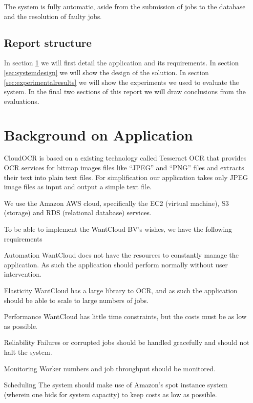 \documentclass[a4paper]{IEEEtran}
\begin{document}
The system is fully automatic, aside from the submission of jobs to the database and the resolution of faulty jobs.

\subsection*{Report structure}
In section \ref{sec:backgroundonapplication} we will first detail the application and its requirements. In section \ref{sec:systemdesign} we will show the design of the solution. In section \ref{sec:experimentalresults} we will show the experiments we used to evaluate the system.
In the final two sections of this report we will draw conclusions from the evaluations.

\section{Background on Application}
\label{sec:backgroundonapplication}
CloudOCR is based on a existing technology called Tesseract OCR \cite{tesseractocr} that provides OCR services for bitmap images files like ``JPEG'' and ``PNG'' files and extracts their text into plain text files. For simplification our application takes only JPEG image files as input and output a simple text file.

We use the Amazon AWS cloud, specifically the EC2 (virtual machine), S3 (storage) and RDS (relational database) services.

To be able to implement the WantCloud BV's wishes, we have the following requirements
\begin{LaTeXdescription}
	\item[Automation] WantCloud does not have the resources to constantly manage the application. As such the application should perform normally without user intervention.
	\item[Elasticity] WantCloud has a large library to OCR, and as such the application should be able to scale to large numbers of jobs.
	\item[Performance] WantCloud has little time constraints, but the costs must be as low as possible.
	\item[Reliability] Failures or corrupted jobs should be handled gracefully and should not halt the system.
	\item[Monitoring] Worker numbers and job throughput should be monitored.
	\item[Scheduling] The system should make use of Amazon's spot instance system (wherein one bids for system capacity) to keep costs as low as possible.
\end{LaTeXdescription}
\end{document}
